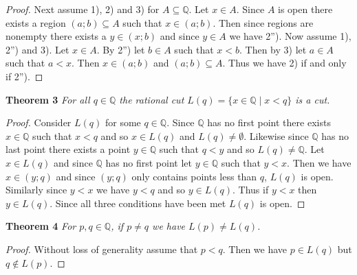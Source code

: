 \documentclass{article}
\begin{document}
\begin{flushleft}
\begin{proof}
Next assume 1), 2) and 3) for $A \subseteq \mathbb{Q}$. Let $x \in A$. Since $A$ is open there exists a region $(a;b) \subseteq A$ such that $x \in (a;b)$. Then since regions are nonempty there exists a $y \in (x;b)$ and since $y \in A$ we have 2''). Now assume 1), 2'') and 3). Let $x \in A$. By 2'') let $b \in A$ such that $x<b$. Then by 3) let $a \in A$ such that $a<x$. Then $x \in (a;b)$ and $(a;b) \subseteq A$. Thus we have 2) if and only if 2'').
\end{proof}

\textbf{Theorem 3}
\textsl{For all $q \in \mathbb{Q}$ the rational cut $L(q) = \{x \in \mathbb{Q} \mid x < q\}$ is a cut.}
\begin{proof}
Consider $L(q)$ for some $q \in \mathbb{Q}$. Since $\mathbb{Q}$ has no first point there exists $x \in \mathbb{Q}$ such that $x<q$ and so $x \in L(q)$ and $L(q) \neq \emptyset$. Likewise since $\mathbb{Q}$ has no last point there exists a point $y \in \mathbb{Q}$ such that $q<y$ and so $L(q) \neq \mathbb{Q}$. Let $x \in L(q)$ and since $\mathbb{Q}$ has no first point let $y \in \mathbb{Q}$ such that $y<x$. Then we have $x \in (y;q)$ and since $(y;q)$ only contains points less than $q$, $L(q)$ is open. Similarly since $y < x$ we have $y<q$ and so $y \in L(q)$. Thus if $y<x$ then $y \in L(q)$. Since all three conditions have been met $L(q)$ is open.
\end{proof}

\textbf{Theorem 4}
\textsl{For $p,q \in \mathbb{Q}$, if $p \neq q$ we have $L(p) \neq L(q)$.}
\begin{proof}
Without loss of generality assume that $p<q$. Then we have $p \in L(q)$ but $q \notin L(p)$.
\end{proof}


\end{flushleft}
\end{document}
